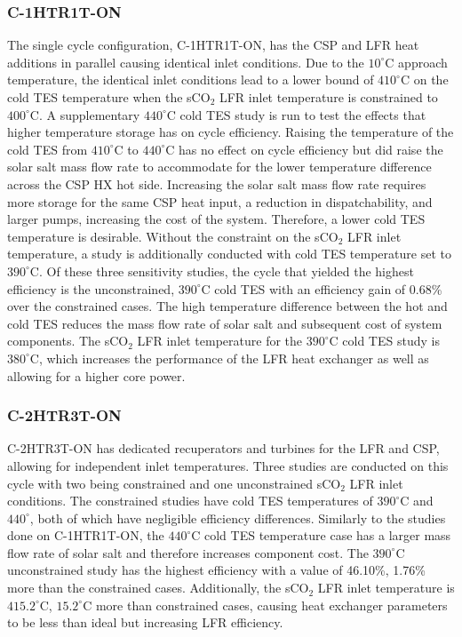 \begin{paracol}{2}
\subsubsection{C-1HTR1T-ON}
The single cycle configuration, C-1HTR1T-ON, has the CSP and LFR heat additions in parallel causing identical inlet conditions. Due to the $10^{\circ}$C approach temperature, the identical inlet conditions lead to a lower bound of $410^{\circ}$C on the cold TES temperature when the sCO$_2$ LFR inlet temperature is constrained to $400^{\circ}$C. A supplementary $440^{\circ}$C cold TES study is run to test the effects that higher temperature storage has on cycle efficiency. Raising the temperature of the cold TES from $410^{\circ}$C to $440^{\circ}$C has no effect on cycle efficiency but did raise the solar salt mass flow rate to accommodate for the lower temperature difference across the CSP HX hot side. Increasing the solar salt mass flow rate requires more storage for the same CSP heat input, a reduction in dispatchability, and larger pumps, increasing the cost of the system. Therefore, a lower cold TES temperature is desirable. Without the constraint on the sCO$_2$ LFR inlet temperature, a study is additionally conducted with cold TES temperature set to $390^{\circ}$C. Of these three sensitivity studies, the cycle that yielded the highest efficiency is the unconstrained, $390^{\circ}$C cold TES with an efficiency gain of 0.68\% over the constrained cases. The high temperature difference between the hot and cold TES reduces the mass flow rate of solar salt and subsequent cost of system components. The sCO$_2$ LFR inlet temperature for the $390^{\circ}$C cold TES study is $380^{\circ}$C, which increases the performance of the LFR heat exchanger as well as allowing for a higher core power. 

\subsubsection{C-2HTR3T-ON}
C-2HTR3T-ON has dedicated recuperators and turbines for the LFR and CSP, allowing for independent inlet temperatures. Three studies are conducted on this cycle with two being constrained and one unconstrained sCO$_2$ LFR inlet conditions. The constrained studies have cold TES temperatures of $390^{\circ}$C and $440^{\circ}$, both of which have negligible efficiency differences. Similarly to the studies done on C-1HTR1T-ON, the $440^{\circ}$C cold TES temperature case has a larger mass flow rate of solar salt and therefore increases component cost. The $390^{\circ}$C unconstrained study has the highest efficiency with a value of 46.10\%, 1.76\% more than the constrained cases. Additionally, the sCO$_2$ LFR inlet temperature is $415.2^{\circ}$C, $15.2^{\circ}$C more than constrained cases, causing heat exchanger parameters to be less than ideal but increasing LFR efficiency.


\end{paracol}
